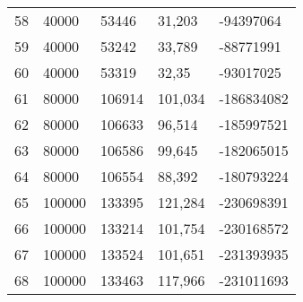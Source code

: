 \begin{longtable}{lllll}
    58               & 40000          & 53446          & 31,203      & -94397064       \\
    59               & 40000          & 53242          & 33,789      & -88771991       \\
    60               & 40000          & 53319          & 32,35       & -93017025       \\
    61               & 80000          & 106914         & 101,034     & -186834082      \\
    62               & 80000          & 106633         & 96,514      & -185997521      \\
    63               & 80000          & 106586         & 99,645      & -182065015      \\
    64               & 80000          & 106554         & 88,392      & -180793224      \\
    65               & 100000         & 133395         & 121,284     & -230698391      \\
    66               & 100000         & 133214         & 101,754     & -230168572      \\
    67               & 100000         & 133524         & 101,651     & -231393935      \\
    68               & 100000         & 133463         & 117,966     & -231011693      
\end{longtable}

